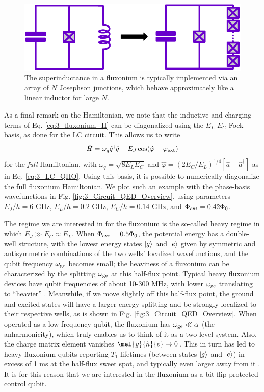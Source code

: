 \begin{figure}
    \centering
    \includegraphics[width=0.7\linewidth]{Figures/3/Superinductance.pdf}
    \caption{The superinductance in a fluxonium is typically implemented via an array of $N$ Josephson junctions, which behave approximately like a linear inductor for large $N$.}
    \label{fig:3_Superinductance}
\end{figure}

As a final remark on the Hamiltonian, we note that the inductive and charging terms of Eq. \eqref{eq:3_fluxonium_H} can be diagonalized using the $E_L$-$E_C$ Fock basis, as done for the LC circuit. This allows us to write
\begin{equation}
    \hat{H} = \omega_q\hat{q}^\dagger\hat{q} - E_J\cos(\hat{\varphi} + \varphi_{\rm ext})
\end{equation}
for the \textit{full} Hamiltonian, with $\omega_q = \sqrt{8 E_LE_C}$ and $\hat{\varphi} = (2E_C/E_L)^{1/4}[\hat{a} + \hat{a}^\dagger]$ as in Eq. \eqref{eq:3_LC_QHO}. Using this basis, it is possible to numerically diagonalize the full fluxonium Hamiltonian. We plot such an example with the phase-basis wavefunctions in Fig. \ref{fig:3_Circuit_QED_Overview}, using parameters $E_J/h = 6$ GHz,  $E_L/h = 0.2$ GHz, $E_C/h = 0.14$ GHz, and $\Phi_{\rm ext} = 0.42\Phi_0$. 

The regime we are interested in for the fluxonium is the so-called heavy regime in which $E_J \gg E_C \approx E_L$. When $\Phi_{\rm ext} = 0.5\Phi_0$, the potential energy has a double-well structure, with the lowest energy states $\lvert g\rangle$ and $\lvert e\rangle$ given by symmetric and antisymmetric combinations of the two wells' localized wavefunctions, and the qubit frequency $\omega_{\rm ge}$ becomes small; the heaviness of a fluxonium can be characterized by the splitting $\omega_{\rm ge}$ at this half-flux point. Typical heavy fluxonium devices have qubit frequencies of about 10-300 MHz, with lower $\omega_{\rm ge}$ translating to ``heavier'' \cite{earnest2018realization, zhang2021universal, ding2023FTF}. Meanwhile, if we move slightly off this half-flux point, the ground and excited states will have a larger energy splitting and be strongly localized to their respective wells, as is shown in Fig. \ref{fig:3_Circuit_QED_Overview}. When operated as a low-frequency qubit, the fluxonium has $\omega_{\rm ge} \ll \alpha$ (the anharmonicity), which truly enables us to think of it as a two-level system. Also, the charge matrix element vanishes $\mel{g}{\hat{n}}{e} \to 0$. This in turn has led to heavy fluxonium qubits reporting $T_1$ lifetimes (between states $\lvert g\rangle$ and $\lvert e\rangle$) in excess of 1 ms at the half-flux sweet spot, and typically even larger away from it \cite{earnest2018realization, zhang2021universal, ding2023FTF, nguyen2019high, somoroff2023millisecond}. It is for this reason that we are interested in the fluxonium as a bit-flip protected control qubit. 

